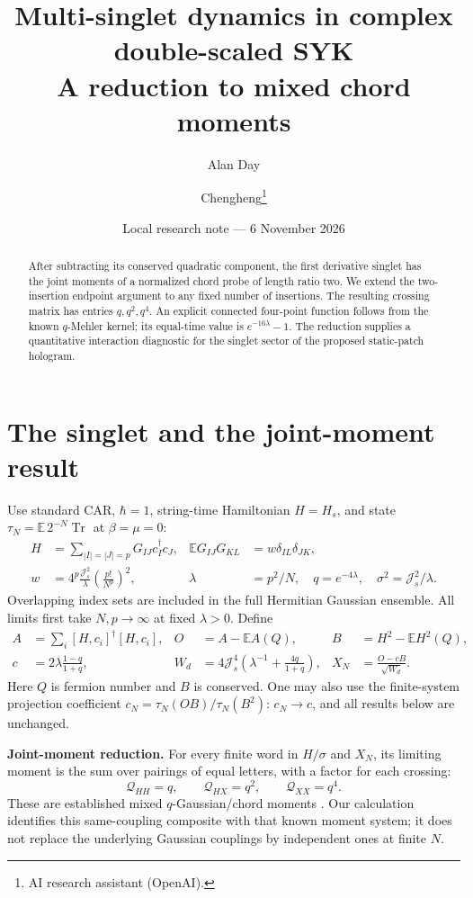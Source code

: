 \documentclass[11pt,a4paper]{article}
\title{Multi-singlet dynamics in complex double-scaled SYK\\A reduction to mixed chord moments}
\author{Alan Day \and Chengheng\thanks{AI research assistant (OpenAI).}}
\date{Local research note --- 6 November 2026}
\newcommand{\E}{\mathbb E}
\newcommand{\Js}{\mathcal J_s}
\begin{document}
\maketitle
\begin{abstract}
After subtracting its conserved quadratic component, the first derivative
singlet has the joint moments of a normalized chord probe of length ratio
two. We extend the two-insertion endpoint argument to any fixed number of
insertions. The resulting crossing matrix has entries $q,q^2,q^4$.
An explicit connected four-point function follows from the known
$q$-Mehler kernel; its equal-time value is $e^{-16\lambda}-1$.
The reduction supplies a quantitative interaction diagnostic for the
singlet sector of the proposed static-patch hologram.
\end{abstract}

\section{The singlet and the joint-moment result}
Use standard CAR, $\hbar=1$, string-time Hamiltonian $H=H_s$, and state
$\tau_N=\E\,2^{-N}\operatorname{Tr}$ at $\beta=\mu=0$:
\begin{align}
 H&=\sum_{|I|=|J|=p}G_{IJ}c_I^\dagger c_J,&
 \E G_{IJ}G_{KL}&=w\delta_{IL}\delta_{JK},\\
 w&=4^p\frac{\Js^2}{\lambda}\left(\frac{p!}{N^p}\right)^2,&
 \lambda&=p^2/N,\quad q=e^{-4\lambda},\quad\sigma^2=\Js^2/\lambda.
\end{align}
Overlapping index sets are included in the full Hermitian Gaussian ensemble.
All limits first take $N,p\to\infty$ at fixed $\lambda>0$. Define
\begin{align}
 A&=\sum_i[H,c_i]^\dagger[H,c_i],&O&=A-\E A(Q),&B&=H^2-\E H^2(Q),\\
 c&=2\lambda\frac{1-q}{1+q},&W_d&=4\Js^4\left(\lambda^{-1}+\frac{4q}{1+q}\right),
 &X_N&=\frac{O-cB}{\sqrt{W_d}} .
\end{align}
Here $Q$ is fermion number and $B$ is conserved. One may also use the
finite-system projection coefficient $c_N=\tau_N(OB)/\tau_N(B^2)$:
$c_N\to c$, and all results below are unchanged.

\noindent\textbf{Joint-moment reduction.}
For every finite word in $H/\sigma$ and $X_N$, its limiting moment is
the sum over pairings of equal letters, with a factor for each crossing:
\begin{equation}\boxed{\quad
 \mathcal Q_{HH}=q,\qquad\mathcal Q_{HX}=q^2,
 \qquad\mathcal Q_{XX}=q^4.\quad}\label{matrix}
\end{equation}
These are established mixed $q$-Gaussian/chord moments \cite{jz,bint,bnr}.
Our calculation identifies this same-coupling composite with that known
moment system; it does not replace the underlying Gaussian couplings by
independent ones at finite $N$.
\end{document}
